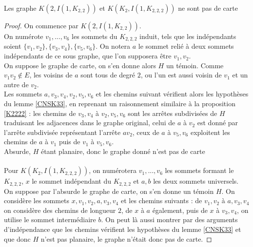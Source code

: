 \documentclass{scrartcl}
\begin{document}
\begin{flushleft}
\begin{lem}
    Les graphe $K(2, I(1, K_{2,2}))$ et $K(K_2, I(1, K_{2,2,2}))$ ne sont pas de carte
\end{lem}

\begin{proof}
    On commence par $K(2, I(1, K_{2,2}))$.\\
    On numérote $v_1, ..., v_6$ les sommets du $K_{2,2,2}$ induit, tels que les indépendants soient $\{v_1, v_2\}, \{v_3,v_4\}, \{v_5,v_6\}$.
    On notera $a$ le sommet relié à deux sommets indépendants de ce sous graphe, que l'on supposera être $v_1, v_2$.\\
    On suppose le graphe de carte, on s'en donne alors $H$ un témoin. Comme $v_1v_2 \notin E$, les voisins de $a$ sont tous de degré
    $2$, ou l'un est aussi voisin de $v_1$ et un autre de $v_2$.\\
    Les sommets $a, v_3, v_4, v_2, v_5, v_6$ et les chemins suivant vérifient alors les hypothèses du lemme \ref{CNSK33}, en reprenant un raisonnement
    similaire à la proposition \ref{K2222} : les chemins de $v_3, v_4$ à $v_2, v_5, v_6$ sont les arrêtes subdivisées de $H$
    traduisant les adjacences dans le graphe original, celui de $a$ à $v_2$ est donné par l'arrête subdivisée représentant l'arrête $av_2$,
    ceux de $a$ à $v_5, v_6$ exploitent les chemins de $a$ à $v_1$ puis de $v_1$ à $v_5, v_6$.\\
    Absurde, $H$ étant planaire, donc le graphe donné n'est pas de carte
    \\~\\
    Pour $K(K_2, I(1, K_{2,2,2}))$, on numérotera $v_1, ..., v_6$ les sommets formant le $K_{2,2,2}$, $x$ le sommet indépendant du $K_{2,2,2}$
    et $a, b$ les deux sommets universels. On suppose par l'absurde le graphe de carte, on s'en donne un témoin $H$. On considère les sommets
    $x, v_1, v_2, a, v_3, v_4$ et les chemins suivants : de $v_1, v_2$ à $a, v_3, v_4$ on considère des chemins de longueur $2$, de
    $x$ à $a$ également, puis de $x$ à $v_3, v_4$, on utilise le sommet intermédiaire $b$. On peut là aussi montrer par des arguments
    d'indépendance que les chemins vérifient les hypothèses du lemme \ref{CNSK33} et que donc $H$ n'est pas planaire, le graphe
    n'était donc pas de carte.
\end{proof}


\end{flushleft}
\end{document}

